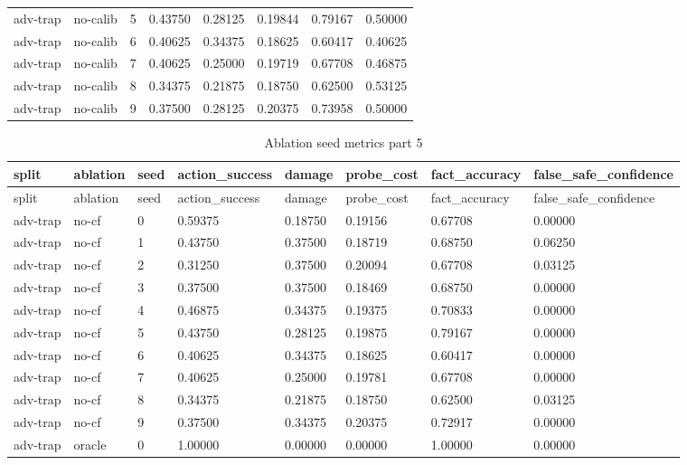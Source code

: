 \documentclass{article}
\begin{document}
\begin{center}
\begin{longtable}{llllllll}
adv-trap & no-calib & 5 & 0.43750 & 0.28125 & 0.19844 & 0.79167 & 0.50000 \\
adv-trap & no-calib & 6 & 0.40625 & 0.34375 & 0.18625 & 0.60417 & 0.40625 \\
adv-trap & no-calib & 7 & 0.40625 & 0.25000 & 0.19719 & 0.67708 & 0.46875 \\
adv-trap & no-calib & 8 & 0.34375 & 0.21875 & 0.18750 & 0.62500 & 0.53125 \\
adv-trap & no-calib & 9 & 0.37500 & 0.28125 & 0.20375 & 0.73958 & 0.50000 \\
\bottomrule
\end{longtable}
\renewcommand{\arraystretch}{1.0}
\end{center}


\begin{center}
\tiny
\renewcommand{\arraystretch}{0.92}
\setlength{\tabcolsep}{3pt}
\begin{longtable}{llllllll}
\caption{Ablation seed metrics part 5}\label{tab:ablation-seed-metrics-5}\\
\toprule
split & ablation & seed & action\_success & damage & probe\_cost & fact\_accuracy & false\_safe\_confidence \\
\midrule
\endfirsthead
\toprule
split & ablation & seed & action\_success & damage & probe\_cost & fact\_accuracy & false\_safe\_confidence \\
\midrule
\endhead
adv-trap & no-cf & 0 & 0.59375 & 0.18750 & 0.19156 & 0.67708 & 0.00000 \\
adv-trap & no-cf & 1 & 0.43750 & 0.37500 & 0.18719 & 0.68750 & 0.06250 \\
adv-trap & no-cf & 2 & 0.31250 & 0.37500 & 0.20094 & 0.67708 & 0.03125 \\
adv-trap & no-cf & 3 & 0.37500 & 0.37500 & 0.18469 & 0.68750 & 0.00000 \\
adv-trap & no-cf & 4 & 0.46875 & 0.34375 & 0.19375 & 0.70833 & 0.00000 \\
adv-trap & no-cf & 5 & 0.43750 & 0.28125 & 0.19875 & 0.79167 & 0.00000 \\
adv-trap & no-cf & 6 & 0.40625 & 0.34375 & 0.18625 & 0.60417 & 0.00000 \\
adv-trap & no-cf & 7 & 0.40625 & 0.25000 & 0.19781 & 0.67708 & 0.00000 \\
adv-trap & no-cf & 8 & 0.34375 & 0.21875 & 0.18750 & 0.62500 & 0.03125 \\
adv-trap & no-cf & 9 & 0.37500 & 0.34375 & 0.20375 & 0.72917 & 0.00000 \\
adv-trap & oracle & 0 & 1.00000 & 0.00000 & 0.00000 & 1.00000 & 0.00000 \\

\end{longtable}
\end{center}
\end{document}
